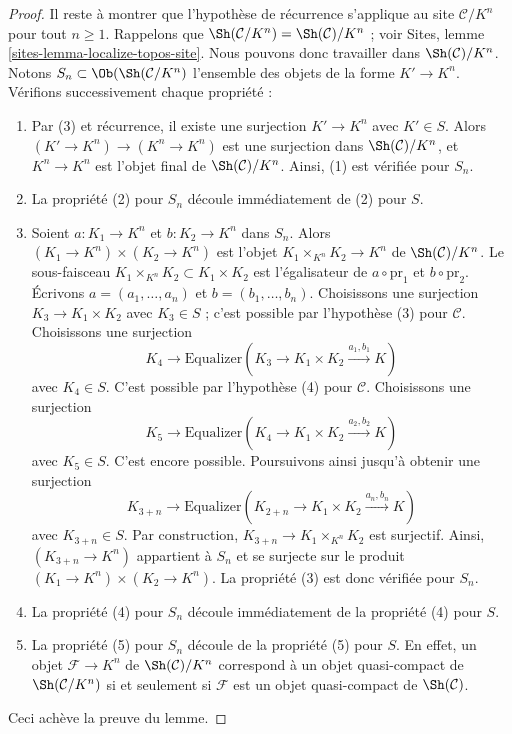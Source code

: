 \begin{proof}
\medskip\noindent
Il reste à montrer que l'hypothèse de récurrence s'applique au site
$\mathcal{C}/K^n$ pour tout $n \geq 1$. Rappelons que
$\Sh(\mathcal{C}/K^n) = \Sh(\mathcal{C})/K^n$ ; voir Sites,
lemme \ref{sites-lemma-localize-topos-site}.
Nous pouvons donc travailler dans $\Sh(\mathcal{C})/K^n$.
Notons $S_n \subset \Ob(\Sh(\mathcal{C}/K^n)$ l'ensemble des objets de la
forme $K' \to K^n$. Vérifions successivement chaque propriété :
\begin{enumerate}
\item Par (3) et récurrence, il existe une surjection $K' \to K^n$ avec
$K' \in S$. Alors $(K' \to K^n) \to (K^n \to K^n)$ est une surjection dans
$\Sh(\mathcal{C})/K^n$, et $K^n \to K^n$ est l'objet final de
$\Sh(\mathcal{C})/K^n$. Ainsi, (1) est vérifiée pour $S_n$.
\item La propriété (2) pour $S_n$ découle immédiatement de (2) pour $S$.
\item Soient $a : K_1 \to K^n$ et $b : K_2 \to K^n$ dans $S_n$.
Alors $(K_1 \to K^n) \times (K_2 \to K^n)$ est l'objet
$K_1 \times_{K^n} K_2 \to K^n$ de $\Sh(\mathcal{C})/K^n$.
Le sous-faisceau $K_1 \times_{K^n} K_2 \subset K_1 \times K_2$ est
l'égalisateur de $a \circ \text{pr}_1$ et $b \circ \text{pr}_2$.
Écrivons $a = (a_1, \ldots, a_n)$ et $b = (b_1, \ldots, b_n)$.
Choisissons une surjection $K_3 \to K_1 \times K_2$ avec $K_3 \in S$ ;
c'est possible par l'hypothèse (3) pour $\mathcal{C}$.
Choisissons une surjection
$$
K_4
\longrightarrow
\text{Equalizer}(K_3 \to K_1 \times K_2 \xrightarrow{a_1, b_1} K)
$$
avec $K_4 \in S$.
C'est possible par l'hypothèse (4) pour $\mathcal{C}$.
Choisissons une surjection
$$
K_5
\longrightarrow
\text{Equalizer}(K_4 \to K_1 \times K_2 \xrightarrow{a_2, b_2} K)
$$
avec $K_5 \in S$.
C'est encore possible. Poursuivons ainsi jusqu'à obtenir une surjection
$$
K_{3 + n}
\longrightarrow
\text{Equalizer}(K_{2 + n} \to K_1 \times K_2 \xrightarrow{a_n, b_n} K)
$$
avec $K_{3 + n} \in S$. Par construction,
$K_{3 + n} \to K_1 \times_{K^n} K_2$
est surjectif. Ainsi, $(K_{3 + n} \to K^n)$ appartient à $S_n$ et se
surjecte sur le produit $(K_1 \to K^n) \times (K_2 \to K^n)$.
La propriété (3) est donc vérifiée pour $S_n$.
\item La propriété (4) pour $S_n$ découle immédiatement de la propriété
(4) pour $S$.
\item La propriété (5) pour $S_n$ découle de la propriété (5) pour $S$.
En effet, un objet $\mathcal{F} \to K^n$ de $\Sh(\mathcal{C})/K^n$
correspond à un objet quasi-compact de $\Sh(\mathcal{C}/K^n)$ si et seulement
si $\mathcal{F}$ est un objet quasi-compact de $\Sh(\mathcal{C})$.
\end{enumerate}
Ceci achève la preuve du lemme.
\end{proof}


